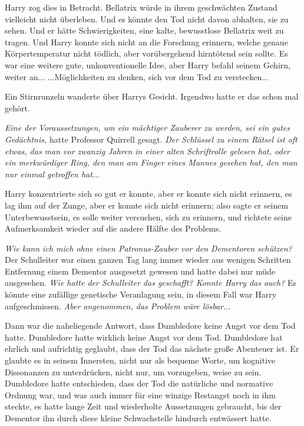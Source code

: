 Harry zog dies in Betracht. Bellatrix würde in ihrem geschwächten Zustand
vielleicht nicht überleben. Und es könnte den Tod nicht davon abhalten, sie zu
sehen. Und er hätte Schwierigkeiten, eine kalte, bewusstlose Bellatrix weit zu
tragen. Und Harry konnte sich nicht an die Forschung erinnern, welche genaue
Körpertemperatur nicht tödlich, aber vorübergehend hirntötend sein sollte. Es
war eine weitere gute, unkonventionelle Idee, aber Harry befahl seinem Gehirn,
weiter an... ...Möglichkeiten zu denken, sich vor dem Tod zu verstecken...

Ein Stirnrunzeln wanderte über Harrys Gesicht. Irgendwo hatte er das schon mal
gehört.

\emph{Eine der Voraussetzungen, um ein mächtiger Zauberer zu werden, sei ein
gutes Gedächtnis,} hatte Professor Quirrell gesagt.\emph{ Der Schlüssel zu einem
Rätsel ist oft etwas, das man vor zwanzig Jahren in einer alten Schriftrolle
gelesen hat, oder ein merkwürdiger Ring, den man am Finger eines Mannes gesehen
hat, den man nur einmal getroffen hat.}..

Harry konzentrierte sich so gut er konnte, aber er konnte sich nicht erinnern,
es lag ihm auf der Zunge, aber er konnte sich nicht erinnern; also sagte er
seinem Unterbewusstsein, es solle weiter versuchen, sich zu erinnern, und
richtete seine Aufmerksamkeit wieder auf die andere Hälfte des Problems.

\emph{Wie kann ich mich ohne einen Patronus-Zauber vor den Dementoren schützen?}
Der Schulleiter war einen ganzen Tag lang immer wieder aus wenigen Schritten
Entfernung einem Dementor ausgesetzt gewesen und hatte dabei nur müde
ausgesehen. \emph{Wie hatte der Schulleiter das geschafft? Konnte Harry das
auch?} Es könnte eine zufällige genetische Veranlagung sein, in diesem Fall war
Harry aufgeschmissen. \emph{Aber angenommen, das Problem wäre lösbar.}..

Dann war die naheliegende Antwort, dass Dumbledore keine Angst vor dem Tod
hatte. Dumbledore hatte wirklich keine Angst vor dem Tod. Dumbledore hat ehrlich
und aufrichtig geglaubt, dass der Tod das nächste große Abenteuer ist. Er
glaubte es in seinem Innersten, nicht nur als bequeme Worte, um kognitive
Dissonanzen zu unterdrücken, nicht nur, um vorzugeben, weise zu sein. Dumbledore
hatte entschieden, dass der Tod die natürliche und normative Ordnung war, und
was auch immer für eine winzige Restangst noch in ihm steckte, es hatte lange
Zeit und wiederholte Aussetzungen gebraucht, bis der Dementor ihn durch diese
kleine Schwachstelle hindurch entwässert hatte.

